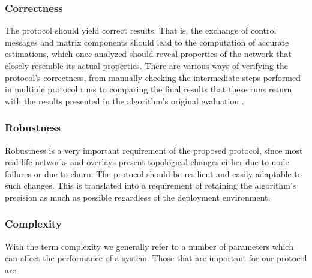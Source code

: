 \documentclass[a4paper,11pt,twoside]{report}
\begin{document}
\subsubsection*{Correctness}

The protocol should yield correct results. That is, the exchange of control messages and matrix components should lead to the computation of accurate estimations, which once analyzed should reveal properties of the network that closely resemble its actual properties. There are various ways of verifying the protocol's correctness, from manually checking the intermediate steps performed in multiple protocol runs to comparing the final results that these runs return with the results presented in the algorithm's original evaluation \cite{6195806}.


\subsubsection*{Robustness}

Robustness is a very important requirement of the proposed protocol, since most real-life networks and overlays present topological changes either due to node failures or due to churn. The protocol should be resilient and easily adaptable to such changes. This is translated into a requirement of retaining the algorithm's precision as much as possible regardless of the deployment environment. 

\subsubsection*{Complexity}

With the term complexity we generally refer to a number of parameters which can affect the performance of a system. Those that are important for our protocol are:
\end{document}
